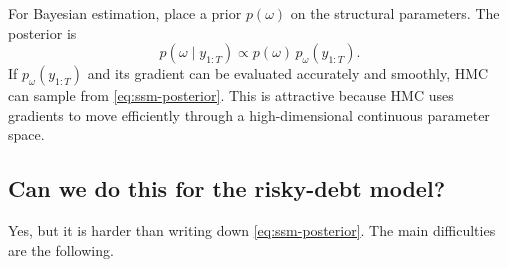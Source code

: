 \documentclass[11pt]{article}
\newcommand{\1}{\mathbf{1}}
\begin{document}
For Bayesian estimation, place a prior \(p(\omega)\) on the structural
parameters. The posterior is
\begin{equation}
  p(\omega\mid y_{1:T})
  \propto
  p(\omega)\,p_\omega(y_{1:T}).
  \label{eq:ssm-posterior}
\end{equation}
If \(p_\omega(y_{1:T})\) and its gradient can be evaluated accurately and
smoothly, HMC can sample from \cref{eq:ssm-posterior}. This is attractive
because HMC uses gradients to move efficiently through a high-dimensional
continuous parameter space.

\subsection{Can we do this for the risky-debt model?}

Yes, but it is harder than writing down \cref{eq:ssm-posterior}. The main
difficulties are the following.
\end{document}
